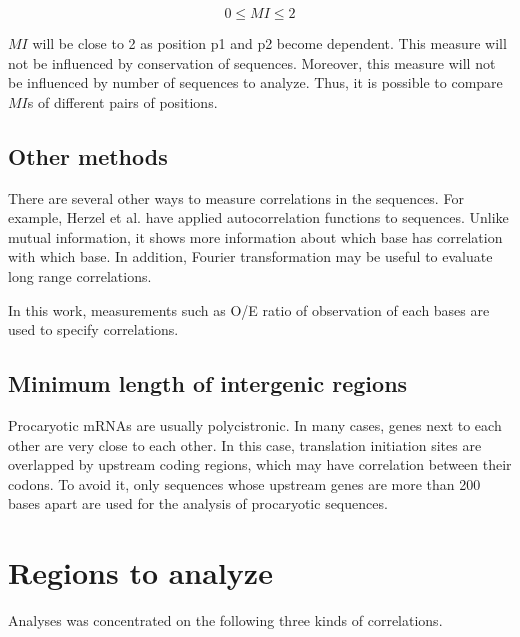 \[ 0 \leq MI \leq 2 \]

\(MI\) will be close to 2 as position p1 and p2 become dependent. 
This measure will not be influenced by conservation of sequences. 
Moreover, this measure will not be influenced by number of sequences to 
analyze. Thus, it is possible to compare \(MI\)s of different pairs of 
positions. 


\subsection{Other methods}

There are several other ways to measure correlations in the sequences. 
For example, Herzel et al.\cite{label511} have applied autocorrelation
functions to sequences. Unlike mutual information, it shows more
information about which base has correlation with which base. In
addition, Fourier transformation may be useful to evaluate long range
correlations.

In this work, measurements such as O/E ratio of observation of each
bases are used to specify correlations.

\subsection{Minimum length of intergenic regions}

Procaryotic mRNAs are usually polycistronic. In many cases, genes next
to each other are very close to each other. In this case, translation
initiation sites are overlapped by upstream coding regions, which may
have correlation between their codons.  To avoid it, only sequences
whose upstream genes are more than 200 bases apart are used for the
analysis of procaryotic sequences.


\section{Regions to analyze}

Analyses was concentrated on the following three kinds of correlations.

